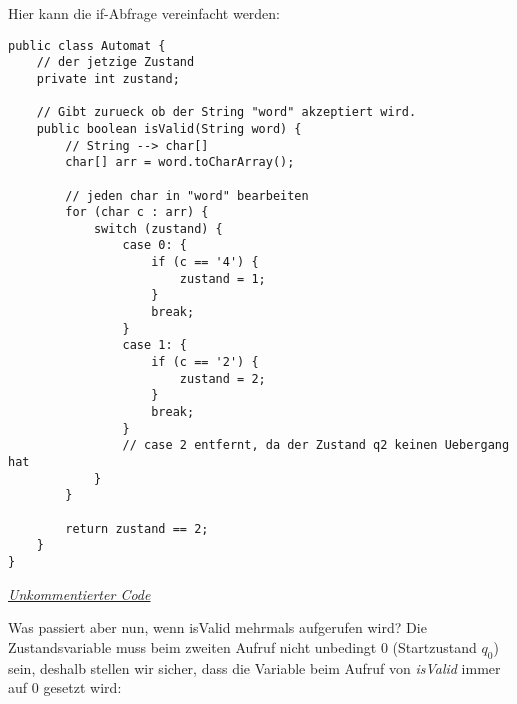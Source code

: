 \begin{flushleft}
Hier kann die if-Abfrage vereinfacht werden: 
\end{flushleft}

\begin{center}
\begin{lstlisting}
public class Automat {
    // der jetzige Zustand
    private int zustand;

    // Gibt zurueck ob der String "word" akzeptiert wird.
    public boolean isValid(String word) {
        // String --> char[]
        char[] arr = word.toCharArray();

        // jeden char in "word" bearbeiten
        for (char c : arr) {
            switch (zustand) {
                case 0: {
                    if (c == '4') {
                        zustand = 1;
                    }
                    break;
                }
                case 1: {
                    if (c == '2') {
                        zustand = 2;
                    }
                    break;
                }
                // case 2 entfernt, da der Zustand q2 keinen Uebergang hat
            }
        }

        return zustand == 2;
    }
}
\end{lstlisting}
\href{https://raw.githubusercontent.com/tim-tm/articles/refs/heads/main/informatik-notes/code/Automat.java}{\textit{Unkommentierter Code}} \\
\end{center}

\begin{flushleft}
Was passiert aber nun, wenn isValid mehrmals aufgerufen wird?
Die Zustandsvariable muss beim zweiten Aufruf nicht unbedingt
0 (Startzustand $q_0$) sein, deshalb stellen wir sicher, dass
die Variable beim Aufruf von \textit{isValid} immer auf 0 gesetzt wird:
\end{flushleft}


